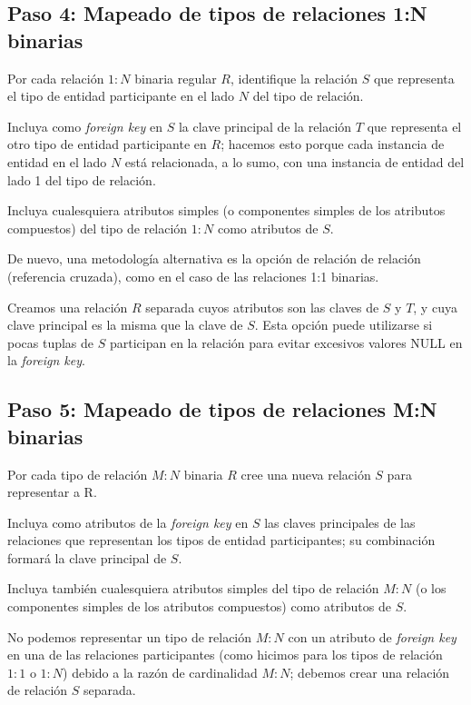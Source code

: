 \subsection*{Paso 4: Mapeado de tipos de relaciones 1:N binarias}
Por cada relación $1:N$ binaria regular $R$, identifique la relación $S$ que representa el tipo de entidad participante en el lado $N$ del tipo de relación. 


Incluya como \textit{foreign key} en $S$ la clave principal de la relación $T$ que representa el otro tipo de entidad participante en $R$; hacemos esto porque cada instancia de entidad en el lado $N$ está relacionada, a lo sumo, con una instancia de entidad del lado 1 del tipo de relación. 


Incluya cualesquiera atributos simples (o componentes simples de los atributos compuestos) del tipo de relación $1:N$ como atributos de $S$.


De nuevo, una metodología alternativa es la opción de relación de relación (referencia cruzada), como en el
caso de las relaciones 1:1 binarias. 


Creamos una relación $R$ separada cuyos atributos son las claves de $S$ y $T$, y cuya clave principal es la misma que la clave de $S$. Esta opción puede utilizarse si pocas tuplas de $S$ participan en la relación para evitar excesivos valores NULL en la \textit{foreign key}.


\subsection*{Paso 5: Mapeado de tipos de relaciones M:N binarias}

Por cada tipo de relación $M:N$ binaria $R$ cree una nueva relación $S$ para representar a R.


Incluya como atributos de la \textit{foreign key} en $S$ las claves principales de las relaciones que representan los tipos de entidad participantes; su combinación formará la clave principal de $S$.


Incluya también cualesquiera atributos simples del tipo de relación $M:N$ (o los componentes simples de los atributos compuestos) como atributos de $S$.


No podemos representar un tipo de relación $M:N$ con un atributo de \textit{foreign key} en una de las relaciones participantes (como hicimos para los tipos de relación $1:1$ o $1:N$) debido a la razón de cardinalidad $M:N$; debemos crear una relación de relación $S$ separada.

